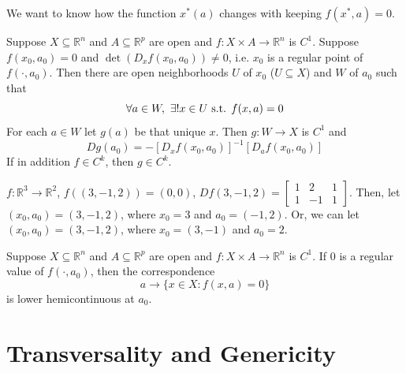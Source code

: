\documentclass[11pt]{elegantbook}
\begin{document}
We want to know how the function $x^*(a)$ changes with keeping $f(x^*,a)=0$.
\begin{theorem}
    Suppose $X \subseteq \mathbb{R}^n$ and $A \subseteq \mathbb{R}^p$ are open and $f : X \times A \rightarrow \mathbb{R}^n$ is $C^1$. Suppose $f(x_0, a_0) = 0$ and $\det(D_x f(x_0, a_0)) \neq 0$, i.e. $x_0$ is a regular point of $f(\cdot, a_0)$. Then there are open neighborhoods $U$ of $x_0$ ($U \subseteq X$) and $W$ of $a_0$ such that
    $$\forall a\in W,\ \exists ! x\in U \textnormal{ s.t. }f(x,a)=0$$
    For each $a \in W$ let $g(a)$ be that unique $x$. Then $g : W \rightarrow X$ is $C^1$ and $$Dg(a_0)=-[D_x f(x_0, a_0)]^{-1}[D_a f(x_0, a_0)]$$
    If in addition $f \in C^k$, then $g \in C^k$.
\end{theorem}
\begin{example}
    $f: \mathbb{R}^3 \rightarrow \mathbb{R}^2$, $f((3,-1,2))=(0,0)$, $Df(3,-1,2)=\begin{bmatrix}
        1&2&1\\
        1&-1&1
    \end{bmatrix}$. Then,
    let $(x_0,a_0)=(3,-1,2)$, where $x_0=3$ and $a_0=(-1,2)$. Or, we can let $(x_0,a_0)=(3,-1,2)$, where $x_0=(3,-1)$ and $a_0=2$.
\end{example}

\begin{corollary}
    Suppose $X \subseteq \mathbb{R}^n$ and $A \subseteq \mathbb{R}^p$ are open and $f : X \times A \rightarrow \mathbb{R}^n$ is $C^1$. If $0$ is a regular value of $f(\cdot, a_0)$, then the correspondence $$a \rightarrow \{x\in X: f(x,a)=0\}$$
    is lower hemicontinuous at $a_0$.
\end{corollary}


\section{Transversality and Genericity}
\end{document}
